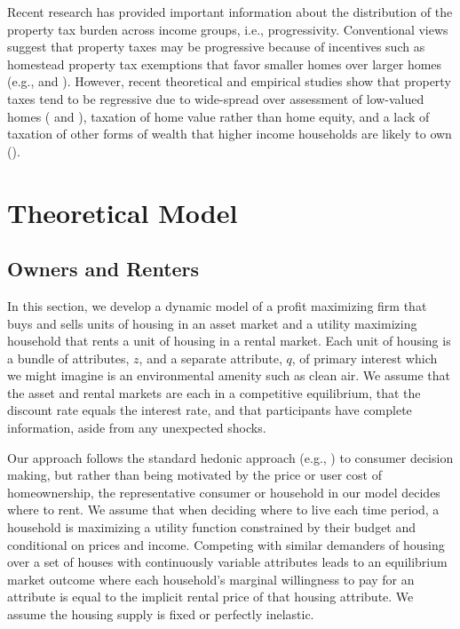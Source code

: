 \documentclass[ecta,nameyear,draft]{econsocart}
\theoremstyle{plain}
\theoremstyle{remark}
\begin{document}
Recent research has provided important information about the distribution of the property tax burden across income groups, i.e., progressivity. Conventional views suggest that property taxes may be progressive because of incentives such as homestead property tax exemptions that favor smaller homes over larger homes (e.g., \cite{zodrow14} and \cite{mcmillen20}).  However, recent theoretical and empirical studies show that property taxes tend to be regressive due to wide-spread over assessment of low-valued homes (\cite{mcmillen20} and \cite{berry21}), taxation of home value rather than home equity, and a lack of taxation of other forms of wealth that higher income households are likely to own (\cite{levinson21}).







\section{Theoretical Model}
\subsection{Owners and Renters}
In this section, we develop a dynamic model of a profit maximizing firm that buys and sells units of housing in an asset market and a utility maximizing household that rents a unit of housing in a rental market. Each unit of housing is a bundle of attributes, $z$, and a separate attribute, $q$, of primary interest which we might imagine is an environmental amenity such as clean air. We assume that the asset and rental markets are each in a competitive equilibrium, that the discount rate equals the interest rate, and that participants have complete information, aside from any unexpected shocks.

Our approach follows the standard hedonic approach (e.g., \cite{rosen74}) to consumer decision making, but rather than being motivated by the price or user cost of homeownership, the representative consumer or household in our model decides where to rent. We assume that when deciding where to live each time period, a household is maximizing a utility function constrained by their budget and conditional on prices and income. Competing with similar demanders of housing over a set of houses with continuously variable attributes leads to an equilibrium market outcome where each household's marginal willingness to pay for an attribute is equal to the implicit rental price of that housing attribute. We assume the housing supply is fixed or perfectly inelastic.
\end{document}
